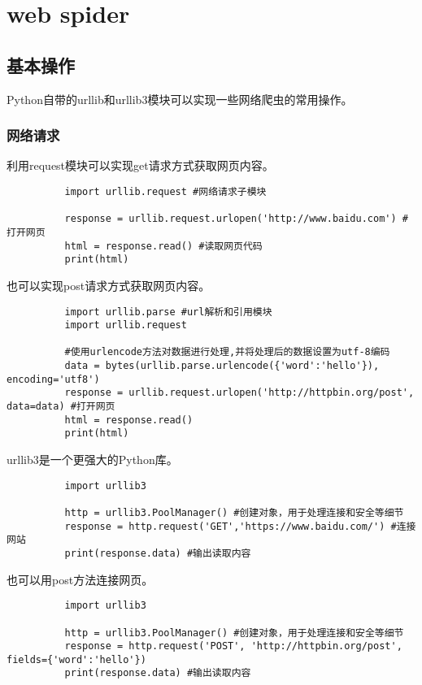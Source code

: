 \documentclass{article}
\begin{document}
  \section{web spider}

    \subsection{基本操作}
      Python自带的urllib和urllib3模块可以实现一些网络爬虫的常用操作。
      \subsubsection{网络请求}
        利用request模块可以实现get请求方式获取网页内容。
        \begin{lstlisting}
          import urllib.request #网络请求子模块

          response = urllib.request.urlopen('http://www.baidu.com') #打开网页
          html = response.read() #读取网页代码
          print(html)
        \end{lstlisting}

        也可以实现post请求方式获取网页内容。
        \begin{lstlisting}
          import urllib.parse #url解析和引用模块
          import urllib.request

          #使用urlencode方法对数据进行处理,并将处理后的数据设置为utf-8编码
          data = bytes(urllib.parse.urlencode({'word':'hello'}), encoding='utf8')
          response = urllib.request.urlopen('http://httpbin.org/post', data=data) #打开网页
          html = response.read()
          print(html)
        \end{lstlisting}

        urllib3是一个更强大的Python库。
        \begin{lstlisting}
          import urllib3

          http = urllib3.PoolManager() #创建对象，用于处理连接和安全等细节
          response = http.request('GET','https://www.baidu.com/') #连接网站
          print(response.data) #输出读取内容
        \end{lstlisting}

        也可以用post方法连接网页。
        \begin{lstlisting}
          import urllib3

          http = urllib3.PoolManager() #创建对象，用于处理连接和安全等细节
          response = http.request('POST', 'http://httpbin.org/post', fields={'word':'hello'})
          print(response.data) #输出读取内容
        \end{lstlisting}
\end{document}
